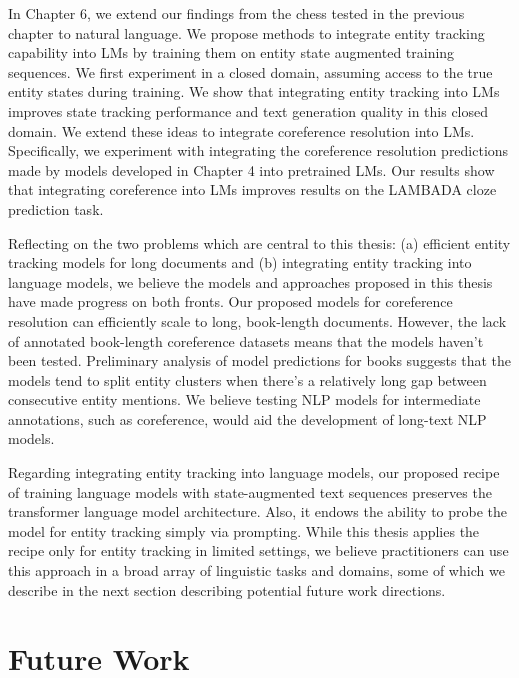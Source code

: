 \documentclass[12pt]{thesis-umich}[thesis]
\begin{document}
In Chapter 6, we extend our findings from the chess tested in the previous chapter to natural language. 
We propose methods to integrate entity tracking capability into LMs by training them on entity state augmented training sequences.  
We first experiment in a closed domain, assuming access to the true entity states during training. 
We show that integrating entity tracking into LMs improves state tracking performance and text generation quality in this closed domain. 
We extend these ideas to integrate coreference resolution into LMs. 
Specifically, we experiment with integrating the coreference resolution predictions made by models developed in Chapter 4 into pretrained LMs. 
Our results show that integrating coreference into LMs improves results on the LAMBADA cloze prediction task.  


Reflecting on the two problems which are central to this thesis: (a) efficient entity tracking models for long documents and (b) integrating entity tracking into language models, we believe the models and approaches proposed in this thesis have made progress on both fronts. Our proposed models for coreference resolution can efficiently scale to long, book-length documents. However, the lack of annotated book-length coreference datasets means that the models haven't been tested. Preliminary analysis of model predictions for books suggests that the models tend to split entity clusters when there's a relatively long gap between consecutive entity mentions. We believe testing NLP models for intermediate annotations, such as  coreference, would aid the development of long-text NLP models. 

Regarding integrating entity tracking into language models, our proposed recipe of training language models with state-augmented text sequences preserves the transformer language model architecture. Also, it endows the ability to probe the model for entity tracking simply via prompting. While this thesis applies the recipe only for entity tracking in limited settings, we believe practitioners can use this approach in a broad array of linguistic tasks and domains, some of which we describe in the next section describing potential future work directions.





    

    
 
\section{Future Work}
\end{document}
